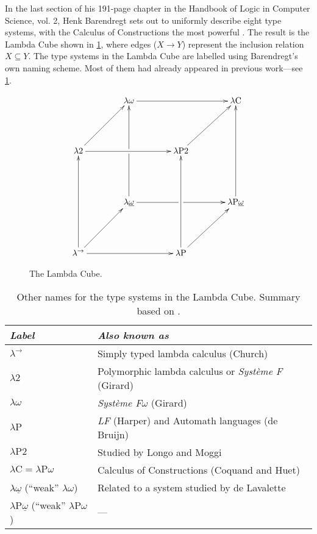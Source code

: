 \documentclass[12pt,toc=bibliography,numbers=noendperiod,
               footnotes=multiple,twoside]{scrartcl}
\begin{document}
In the last section of his 191-page chapter  in the Handbook of Logic in Computer Science, vol. 2, Henk Barendregt sets out to uniformly describe eight type systems, with the Calculus of Constructions the most powerful \autocite{barendregt_lambda_1992}. The result is the Lambda Cube shown in \cref{fig:lambda-cube}, where edges (\(X \longrightarrow Y\)) represent the inclusion relation \(X \subseteq Y\). The type systems in the Lambda Cube are labelled using Barendregt's own naming scheme. Most of them had already appeared in previous work---see \cref{tab:lambda-cube-type-systems}.

\begin{figure}
\begin{equation*}
\xymatrix@R46pt@C40pt{%
&\lambda\omega\ar@{->}[rr]&&\lambda\textrm{C} \\
\lambda\textrm{2}\ar@{->}[rr]\ar@{->}[ur]&&\lambda\textrm{P2}\ar@{->}[ur] \\
&\lambda\underline{\omega}\ar@{->}[uu]|!{"2,1";"2,3"}\hole\ar@{->}[rr]|!{"4,3";"2,3"}\hole&&\lambda\textrm{P}\underline{\omega}\ar@{->}[uu] \\
\lambda^{\rightarrow}\ar@{->}[uu]\ar@{->}[rr]\ar@{->}[ur]&&\lambda\textrm{P}\ar@{->}[uu]\ar@{->}[ur]
}
\end{equation*}
\caption{The Lambda Cube.}
\label{fig:lambda-cube}
\end{figure}

\begin{table}[h]
    \centering
    \begin{tabular}{l l}
        \toprule
        \textit{Label} & \textit{Also known as} \\
        \midrule
        \(\lambda^{\rightarrow}\) & Simply typed lambda calculus (Church) \\
        \(\lambda\textrm{2}\) & Polymorphic lambda calculus or \emph{Système F} (Girard) \\
        \(\lambda\omega\) & \emph{Système F\(\omega\)} (Girard) \\
        \(\lambda\textrm{P}\) & \emph{LF} (Harper) and Automath languages (de Bruijn) \\
        \(\lambda\textrm{P2}\) & Studied by Longo and Moggi \\
        \(\lambda\textrm{C} = \lambda\textrm{P}\omega\) & Calculus of Constructions (Coquand and Huet) \\
        \(\lambda\underline{\omega}\) (\enquote{weak} \(\lambda\omega\)) & Related to a system studied by de Lavalette \\
        \(\lambda\textrm{P}\underline{\omega}\) (\enquote{weak} \(\lambda\textrm{P}\omega\)) & --- \\
        \bottomrule
    \end{tabular}
    \caption{Other names for the type systems in the Lambda Cube. Summary based on \textcite[193]{barendregt_lambda_1992}.}
    \label{tab:lambda-cube-type-systems}
\end{table}
\end{document}
